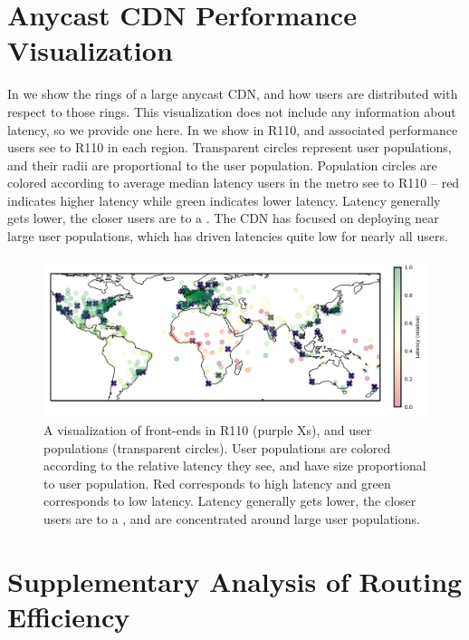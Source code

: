 \documentclass[sigconf,letterpaper,nonacm,10pt,anonymous]{acmart}
\begin{document}
\section{Anycast CDN Performance
Visualization}\label{anycast-cdn-performance-visualization}

\label{ap:anycast_cdn_performance_viz}

In  we show the rings of a large anycast CDN,
and how users are distributed with respect to those rings. This
visualization does not include any information about latency, so we
provide one here. In  we
show \feplural in R110, and associated performance users see to R110 in
each region. Transparent circles represent user populations, and their
radii are proportional to the user population. Population circles are
colored according to average median latency users in the metro see to
R110 -- red indicates higher latency while green indicates lower
latency. Latency generally gets lower, the closer users are to a \fe.
The CDN has focused on deploying \feplural near large user populations,
which has driven latencies quite low for nearly all users.

\begin{figure}
    \centering
    \includegraphics[width=\linewidth]{figures/microsoft_performance_deployment_map.pdf}
    \caption{A visualization of front-ends in R110 (purple Xs), and user populations (transparent circles). User populations are colored according to the relative latency they see, and have size proportional to user population. Red corresponds to high latency and green corresponds to low latency. Latency generally gets lower, the closer users are to a \fe, and \feplural are concentrated around large user populations.}
    \label{fig:microsoft_performance_deployment_map}
\end{figure}

\section{Supplementary Analysis of Routing
Efficiency}\label{supplementary-analysis-of-routing-efficiency}
\end{document}
